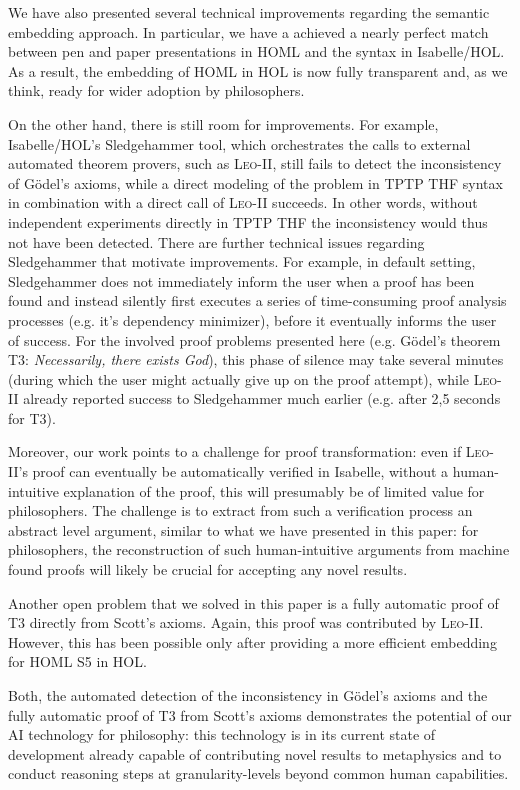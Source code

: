 \documentclass{article}
\begin{document}
We have also presented several technical improvements regarding the
semantic embedding approach. In particular, we have a achieved a
nearly perfect match between pen and paper presentations in HOML and
the syntax in Isabelle/HOL. As a result, the embedding of HOML in HOL
is now fully transparent and, as we think, ready for wider adoption by
philosophers.

On the other hand, there is still room for improvements. For example, Isabelle/HOL's Sledgehammer tool, which
orchestrates the calls to external automated theorem provers, such as
\textsc{Leo-II}, still fails to detect the inconsistency of G\"odel's
axioms, while a direct modeling of the problem in TPTP THF syntax in
combination with a direct call of \textsc{Leo-II} succeeds. In other
words, without independent experiments directly in TPTP THF the
inconsistency would thus not have been detected. There are further
technical issues regarding Sledgehammer that motivate
improvements. For example, in default setting, Sledgehammer does not
immediately inform the user when a proof has been found and instead silently
 first executes a series of time-consuming proof analysis processes (e.g. it's
dependency minimizer), before it eventually informs the user of success. For the
involved proof problems presented here (e.g. G\"odel's theorem T3:
\textit{Necessarily, there exists God}), this phase of silence may
take several minutes (during which the user might actually give up on
the proof attempt), while \textsc{Leo-II} already reported success to
Sledgehammer much earlier (e.g. after 2,5 seconds for T3).

Moreover, our work points to a challenge for proof transformation:
even if \textsc{Leo-II}'s proof can eventually be automatically
verified in Isabelle, without a human-intuitive explanation of the
proof, this will presumably be of limited value for philosophers.  The
challenge is to extract from such a verification process an abstract
level argument, similar to what we have presented in this paper: for
philosophers, the reconstruction of such human-intuitive arguments
from machine found proofs will likely be crucial for accepting any
novel results.

Another open problem that we solved in this paper is a fully automatic
proof of T3 directly from Scott's axioms. Again, this proof was
contributed by \textsc{Leo-II}. However, this has been possible only
after providing a more efficient embedding for HOML S5 in HOL. 

Both, the automated detection of the inconsistency in G\"odel's axioms
and the fully automatic proof of T3 from Scott's axioms demonstrates
the potential of our AI technology for philosophy: this technology is
in its current state of development already capable of contributing novel results to
metaphysics and to conduct reasoning steps at granularity-levels
beyond common human capabilities.
\end{document}
